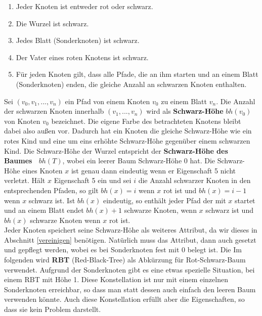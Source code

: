 \documentclass[a4paper,12pt]{article}
\begin{document}
\begin{enumerate}
	\item Jeder Knoten ist entweder rot oder schwarz.
	\item Die Wurzel ist schwarz.
	\item Jedes Blatt (Sonderknoten) ist schwarz.
	\item Der Vater eines roten Knotens ist schwarz.
	\item Für jeden Knoten gilt, dass alle Pfade, die an ihm starten und an einem Blatt (Sonderknoten) enden, die gleiche Anzahl an schwarzen Knoten enthalten. 
\end{enumerate}  
Sei $(v_0,v_1,...,v_n)$ ein Pfad von einem Knoten $v_0$ zu einem Blatt $v_n$. Die Anzahl der schwarzen Knoten innerhalb $(v_1,...,v_n)$ wird als \textbf{Schwarz-Höhe} $\mathit{bh(v_0)}$ von Knoten $v_0$ bezeichnet. Die eigene Farbe des betrachteten Knotens bleibt dabei also außen vor. Dadurch hat ein Knoten die gleiche Schwarz-Höhe wie ein rotes Kind und eine um eins erhöhte Schwarz-Höhe gegenüber einem schwarzen Kind. Die Schwarz-Höhe der Wurzel entspricht der \textbf{Schwarz-Höhe des Baumes~ $bh(T)$}, wobei ein leerer Baum Schwarz-Höhe $0$ hat. Die Schwarz-Höhe eines Knoten $x$ ist genau dann eindeutig wenn er Eigenschaft 5 nicht verletzt. Hält $x$ Eigenschaft 5 ein und sei $i$ die Anzahl schwarzer Knoten in den entsprechenden Pfaden, so gilt $\mathit{bh(x)} = i$ wenn $x$ rot ist und $\mathit{bh(x)} = i - 1$ wenn $x$ schwarz ist. Ist $\mathit{bh(x)}$ eindeutig, so enthält jeder Pfad der mit $x$ startet und an einem Blatt endet $\mathit{bh(x)} + 1$ schwarze Knoten, wenn $x$ schwarz ist und  $\mathit{bh(x)}$ schwarze Knoten wenn $x$ rot ist.\\ Jeder Knoten speichert seine Schwarz-Höhe als weiteres Attribut, da wir dieses in Abschnitt \ref{vereinigen} benötigen. Natürlich muss das Attribut, dann auch gesetzt und gepflegt werden, wobei es bei Sonderknoten fest mit $0$ belegt ist. Die Im folgenden wird \textbf{RBT} (Red-Black-Tree) als Abkürzung für Rot-Schwarz-Baum verwendet. Aufgrund der Sonderknoten gibt es eine etwas spezielle Situation, bei einem RBT mit Höhe 1. Diese Konstellation ist nur mit einem einzelnen Sonderknoten erreichbar, so dass man statt dessen auch einfach den leeren Baum verwenden könnte. Auch diese Konstellation erfüllt aber die Eigenschaften, so dass sie kein Problem darstellt. \\
\end{document}
